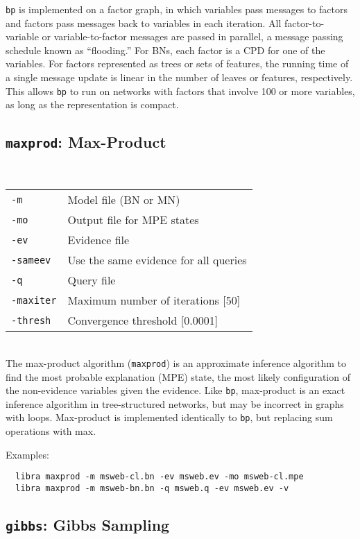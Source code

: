\documentclass[11pt]{article}
\begin{document}
{\tt bp} is implemented on a factor graph, in which variables pass
messages to factors and factors pass messages back to variables in
each iteration.  All factor-to-variable or variable-to-factor messages
are passed in parallel, a message passing schedule known as
``flooding.''  For BNs, each factor is a CPD for one of the variables.
For factors represented as trees or sets of features, the running time
of a single message update is linear in the number of leaves or
features, respectively.  This allows {\tt bp} to run on networks with
factors that involve 100 or more variables, as long as the
representation is compact.

\subsection{{\tt maxprod}: Max-Product} \label{sec:maxprod}

\noindent {} \\
\begin{tabular}{ll}
{\tt -m} &        Model file (BN or MN) \\
{\tt -mo} &       Output file for MPE states \\
{\tt -ev} &       Evidence file \\
{\tt -sameev} &   Use the same evidence for all queries \\
{\tt -q} &        Query file \\
{\tt -maxiter} &  Maximum number of iterations [50] \\
{\tt -thresh} &   Convergence threshold [0.0001] \\
\end{tabular} \\

The max-product algorithm ({\tt maxprod}) is an approximate inference
algorithm to find the most probable explanation (MPE) state, the most
likely configuration of the non-evidence variables given the evidence.
Like {\tt bp}, max-product is an exact inference algorithm in
tree-structured networks, but may be incorrect in graphs with loops.
Max-product is implemented identically to {\tt bp}, but replacing sum
operations with max.

Examples:
\begin{verbatim}
  libra maxprod -m msweb-cl.bn -ev msweb.ev -mo msweb-cl.mpe
  libra maxprod -m msweb-bn.bn -q msweb.q -ev msweb.ev -v
\end{verbatim}


\subsection{{\tt gibbs}: Gibbs Sampling} \label{sec:gibbs}
\end{document}
